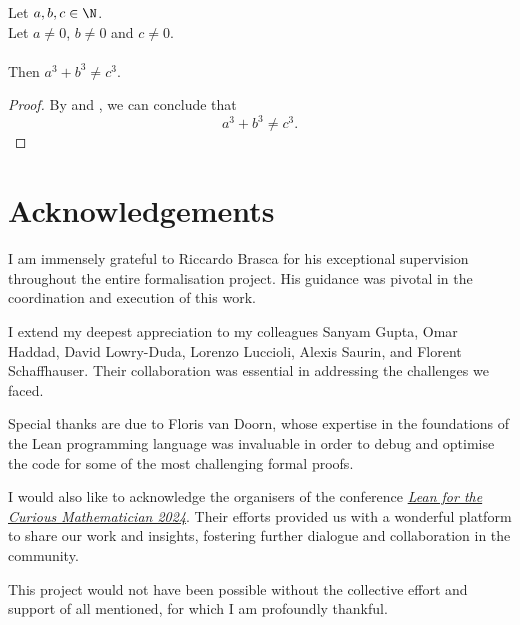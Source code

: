 \begin{theorem}
    \label{thm:fermatLastTheoremThree}
    \leanok
    Let $a, b, c \in \N$. \\
    Let $a \neq 0$, $b \neq 0$ and $c \neq 0$. \\\\
    Then $a^3 + b^3 \neq c^3$.
\end{theorem}
\begin{proof}
    \leanok
    By 
    and , we can conclude that
    $$a^3 + b^3 \neq c^3.$$
\end{proof}


\chapter*{Acknowledgements}

I am immensely grateful to Riccardo Brasca for his exceptional supervision throughout the entire
formalisation project.
His guidance was pivotal in the coordination and execution of this work.

I extend my deepest appreciation to my colleagues Sanyam Gupta, Omar Haddad, David Lowry-Duda,
Lorenzo Luccioli, Alexis Saurin, and Florent Schaffhauser.
Their collaboration was essential in addressing the challenges we faced.

Special thanks are due to Floris van Doorn, whose expertise in the foundations of the Lean
programming language was invaluable in order to debug and optimise the code for some of the most
challenging formal proofs.

I would also like to acknowledge the organisers of the conference
\href{https://conferences.cirm-math.fr/2970.html}{\textit{Lean for the Curious Mathematician 2024}}.
Their efforts provided us with a wonderful platform to share our work and insights,
fostering further dialogue and collaboration in the community.

This project would not have been possible without the collective effort and support of all mentioned,
for which I am profoundly thankful.

%

